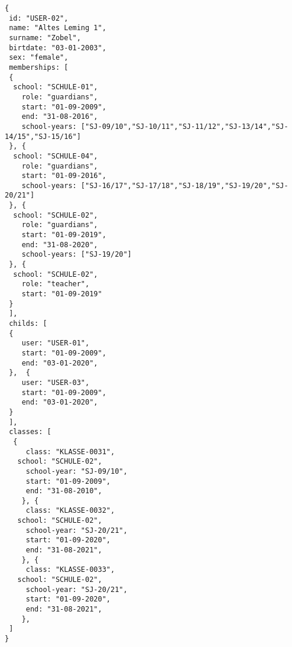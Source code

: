 
\begin{lstlisting}[caption={Beispiel für Benutzer mit Rollen 'teachers' und 'guardians'},frame=tlrb]
{
 id: "USER-02",
 name: "Altes Leming 1",
 surname: "Zobel",
 birtdate: "03-01-2003",
 sex: "female",
 memberships: [
 {
  school: "SCHULE-01",
	role: "guardians",
	start: "01-09-2009",
	end: "31-08-2016",
	school-years: ["SJ-09/10","SJ-10/11","SJ-11/12","SJ-13/14","SJ-14/15","SJ-15/16"]
 }, {
  school: "SCHULE-04",
	role: "guardians",
	start: "01-09-2016",
	school-years: ["SJ-16/17","SJ-17/18","SJ-18/19","SJ-19/20","SJ-20/21"]
 }, {
  school: "SCHULE-02",
	role: "guardians",
	start: "01-09-2019",
	end: "31-08-2020",
	school-years: ["SJ-19/20"]
 }, {
  school: "SCHULE-02",
	role: "teacher",
	start: "01-09-2019"
 }
 ],
 childs: [
 {
	user: "USER-01",
	start: "01-09-2009",
	end: "03-01-2020",
 },  {
	user: "USER-03",
	start: "01-09-2009",
	end: "03-01-2020",
 }
 ],
 classes: [
  {
	 class: "KLASSE-0031",
   school: "SCHULE-02",
	 school-year: "SJ-09/10",
	 start: "01-09-2009",
	 end: "31-08-2010",
	}, {
	 class: "KLASSE-0032",
   school: "SCHULE-02",
	 school-year: "SJ-20/21",
	 start: "01-09-2020",
	 end: "31-08-2021",
	}, {
	 class: "KLASSE-0033",
   school: "SCHULE-02",
	 school-year: "SJ-20/21",
	 start: "01-09-2020",
	 end: "31-08-2021",
	}, 
 ]
}
\end{lstlisting}
